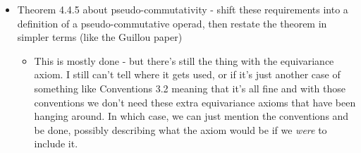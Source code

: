 \documentclass{amsart}
\begin{document}
\begin{itemize}
\item Theorem 4.4.5 about pseudo-commutativity - shift these requirements into a definition of a pseudo-commutative operad, then restate the theorem in simpler terms (like the Guillou paper)
	\begin{itemize}
		\item This is mostly done - but there's still the thing with the equivariance axiom. I still can't tell where it gets used, or if it's just another case of something like Conventions 3.2 meaning that it's all fine and with those conventions we don't need these extra equivariance axioms that have been hanging around. In which case, we can just mention the conventions and be done, possibly describing what the axiom would be if we \emph{were} to include it.

\end{itemize}
\end{itemize}
\end{document}
